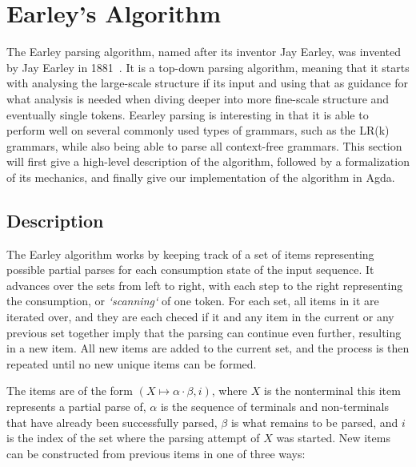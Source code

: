 \chapter{Earley's Algorithm}

	The Earley parsing algorithm, named after its inventor Jay Earley, was
	invented by Jay Earley in 1881~\cite{Earley}. It is a top-down parsing
	algorithm, meaning that it starts with analysing the large-scale structure
	if its input and using that as guidance for what analysis is needed when
	diving deeper into more fine-scale structure and eventually single tokens.
	Eearley parsing is interesting in that it is able to perform well on
	several commonly used types of grammars, such as the LR(k) grammars, while
	also being able to parse all context-free grammars. This section will first
	give a high-level description of the algorithm, followed by a formalization
	of its mechanics, and finally give our implementation of the algorithm in
	Agda.

	\section{Description}
		
		The Earley algorithm works by keeping track of a set of items
		representing possible partial parses for each consumption state of the
		input sequence. It advances over the sets from left to right, with each 
		step to the right representing the consumption, or \emph{`scanning`} of 
		one token. For each set, all items in it are iterated over, and they 
		are each checed if it and any item in the current or any previous set 
		together imply that the parsing can continue even further, resulting in 
		a new item. All new items are added to the current set, and the process 
		is then repeated until no new unique items can be formed.

		The items are of the form $(X \mapsto \alpha \cdot \beta, i)$, where
		$X$ is the nonterminal this item represents a partial parse of,
		$\alpha$ is the sequence of terminals and non-terminals that have
		already been successfully parsed, $\beta$ is what remains to be parsed,
		and $i$ is the index of the set where the parsing attempt of $X$ was
		started. New items can be constructed from previous items in one of
		three ways:

